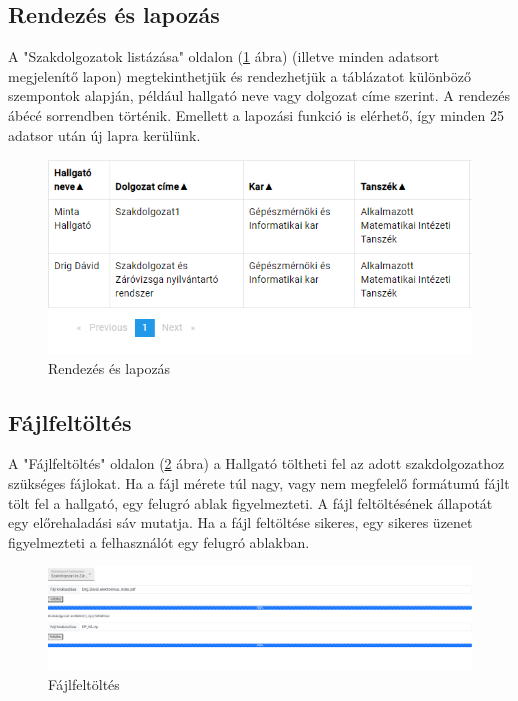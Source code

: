 \subsection{Rendezés és lapozás}

A "Szakdolgozatok listázása" oldalon (\ref{fig:Orderby_pagination} ábra) (illetve minden adatsort megjelenítő lapon) megtekinthetjük és rendezhetjük a táblázatot különböző szempontok alapján, például hallgató neve vagy dolgozat címe szerint. A rendezés ábécé sorrendben történik. Emellett a lapozási funkció is elérhető, így minden 25 adatsor után új lapra kerülünk.

\begin{figure}[h!]
\centering
\includegraphics[width=\textwidth]{images/Orderby_pagination.png}
\caption{Rendezés és lapozás}
\label{fig:Orderby_pagination}
\end{figure}

\subsection{Fájlfeltöltés}

A "Fájlfeltöltés" oldalon (\ref{fig:Upload_files} ábra) a Hallgató töltheti fel az adott szakdolgozathoz szükséges fájlokat. Ha a fájl mérete túl nagy, vagy nem megfelelő formátumú fájlt tölt fel a hallgató, egy felugró ablak figyelmezteti. A fájl feltöltésének állapotát egy előrehaladási sáv mutatja. Ha a fájl feltöltése sikeres, egy sikeres üzenet figyelmezteti a felhasználót egy felugró ablakban.


\begin{figure}[h!]
\centering
\includegraphics[width=\textwidth]{images/Upload_files.png}
\caption{Fájlfeltöltés}
\label{fig:Upload_files}
\end{figure}



